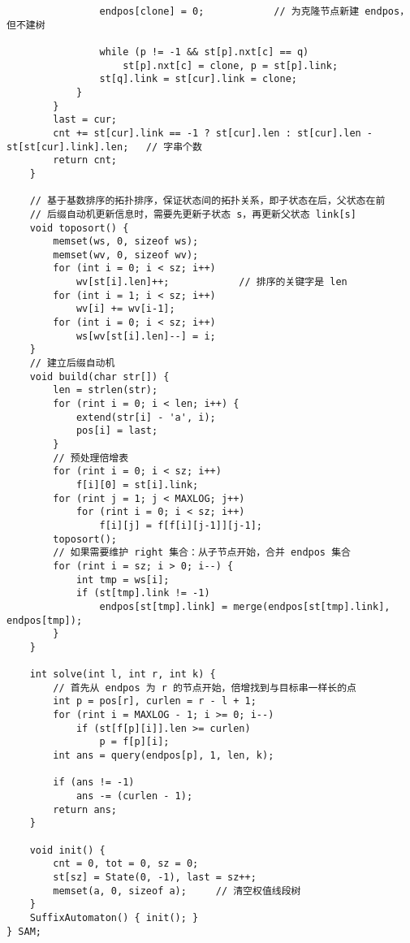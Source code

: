 \begin{verbatim}
                endpos[clone] = 0;			  // 为克隆节点新建 endpos，但不建树

                while (p != -1 && st[p].nxt[c] == q)
                    st[p].nxt[c] = clone, p = st[p].link;
                st[q].link = st[cur].link = clone;
            }
        }
        last = cur;   
        cnt += st[cur].link == -1 ? st[cur].len : st[cur].len - st[st[cur].link].len;   // 字串个数
        return cnt;          
    }
    
    // 基于基数排序的拓扑排序，保证状态间的拓扑关系，即子状态在后，父状态在前
    // 后缀自动机更新信息时，需要先更新子状态 s，再更新父状态 link[s]
    void toposort() {
        memset(ws, 0, sizeof ws);
        memset(wv, 0, sizeof wv);
        for (int i = 0; i < sz; i++)
            wv[st[i].len]++;			// 排序的关键字是 len
        for (int i = 1; i < sz; i++)
            wv[i] += wv[i-1];
        for (int i = 0; i < sz; i++)
            ws[wv[st[i].len]--] = i;
    }
    // 建立后缀自动机
    void build(char str[]) {
        len = strlen(str);
        for (rint i = 0; i < len; i++) {
            extend(str[i] - 'a', i);
            pos[i] = last;
        }
        // 预处理倍增表
        for (rint i = 0; i < sz; i++)
            f[i][0] = st[i].link;
        for (rint j = 1; j < MAXLOG; j++)
            for (rint i = 0; i < sz; i++)
                f[i][j] = f[f[i][j-1]][j-1];
        toposort();
        // 如果需要维护 right 集合：从子节点开始，合并 endpos 集合
        for (rint i = sz; i > 0; i--) {
            int tmp = ws[i];
            if (st[tmp].link != -1)
                endpos[st[tmp].link] = merge(endpos[st[tmp].link], endpos[tmp]);
        }
    }
    
    int solve(int l, int r, int k) {
        // 首先从 endpos 为 r 的节点开始，倍增找到与目标串一样长的点
        int p = pos[r], curlen = r - l + 1;
        for (rint i = MAXLOG - 1; i >= 0; i--)
            if (st[f[p][i]].len >= curlen)
                p = f[p][i];
        int ans = query(endpos[p], 1, len, k);
        
        if (ans != -1)
            ans -= (curlen - 1);
        return ans;
    }

    void init() {
        cnt = 0, tot = 0, sz = 0;
        st[sz] = State(0, -1), last = sz++;
        memset(a, 0, sizeof a);     // 清空权值线段树
    }
    SuffixAutomaton() { init(); }
} SAM;
\end{verbatim}

\clearpage